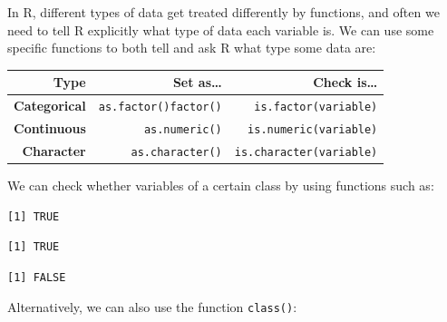 \documentclass[]{book}
\newenvironment{Shaded}{\begin{snugshade}}{\end{snugshade}}
\newcommand{\KeywordTok}[1]{\textcolor[rgb]{0.13,0.29,0.53}{\textbf{#1}}}
\newcommand{\NormalTok}[1]{#1}
\newcommand{\OperatorTok}[1]{\textcolor[rgb]{0.81,0.36,0.00}{\textbf{#1}}}
\begin{document}
In R, different types of data get treated differently by functions, and often we need to tell R explicitly what type of data each variable is. We can use some specific functions to both tell and ask R what type some data are:

\begin{longtable}[]{@{}rrr@{}}
\toprule
\textbf{Type} & \textbf{Set as\ldots{}} & \textbf{Check is\ldots{}}\tabularnewline
\midrule
\endhead
\textbf{Categorical} & \texttt{as.factor()}\texttt{factor()} & \texttt{is.factor(variable)}\tabularnewline
\textbf{Continuous} & \texttt{as.numeric()} & \texttt{is.numeric(variable)}\tabularnewline
\textbf{Character} & \texttt{as.character()} & \texttt{is.character(variable)}\tabularnewline
\bottomrule
\end{longtable}

We can check whether variables of a certain class by using functions such as:

\begin{Shaded}
\end{Shaded}

\begin{verbatim}
[1] TRUE
\end{verbatim}

\begin{Shaded}
\end{Shaded}

\begin{verbatim}
[1] TRUE
\end{verbatim}

\begin{Shaded}
\end{Shaded}

\begin{verbatim}
[1] FALSE
\end{verbatim}

Alternatively, we can also use the function \texttt{class()}:
\end{document}

